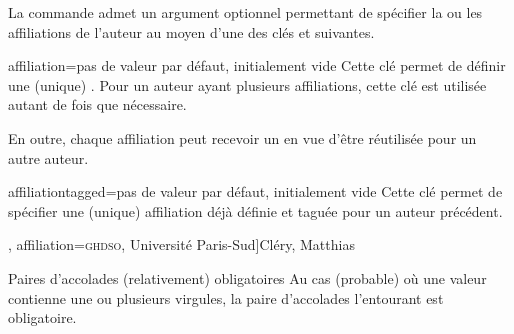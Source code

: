 \documentclass[french,nolocaltoc]{nwejmart}
\newtheorem[title=Fait,style=definition]{fact}
\begin{document}
La commande  admet un argument optionnel permettant de spécifier
la ou les affiliations de l'auteur au moyen d'une des clés 
et  suivantes.

\begin{docKey}{affiliation}{={}}{pas de valeur par défaut,
    initialement vide}
  Cette clé permet de définir une (unique) . Pour un auteur
  ayant plusieurs affiliations, cette clé est utilisée autant de fois que
  nécessaire.

  En outre, chaque affiliation peut recevoir un  en vue d'être
  réutilisée pour un autre auteur.
\end{docKey}

\begin{docKey}{affiliationtagged}{={}}{pas de valeur par défaut,
    initialement vide}
  Cette clé permet de spécifier une (unique) affiliation déjà définie et taguée
  pour un auteur précédent.
\end{docKey}


\begin{bodycode}
\author[
  affiliation={Laboratoire \textsc{sphere}, Université Paris Diderot}
  ]{Bustamante, Martha-Cecilia}
\author[
  affiliation=[aff2]{\textsc{lpma}, Université Pierre et Marie Curie},
  affiliation={\textsc{ghdso}, Université Paris-Sud}]{Cléry, Matthias}
\author[
  affiliationtagged={aff2}
]{Mazliak, Laurent}
\end{bodycode}

\begin{dbwarning}{Paires d'accolades
    (relativement) obligatoires}{}
  Au cas (probable) où une valeur  contienne une ou plusieurs
  virgules, la paire d'accolades l'entourant est obligatoire.
\end{dbwarning}
\end{document}
